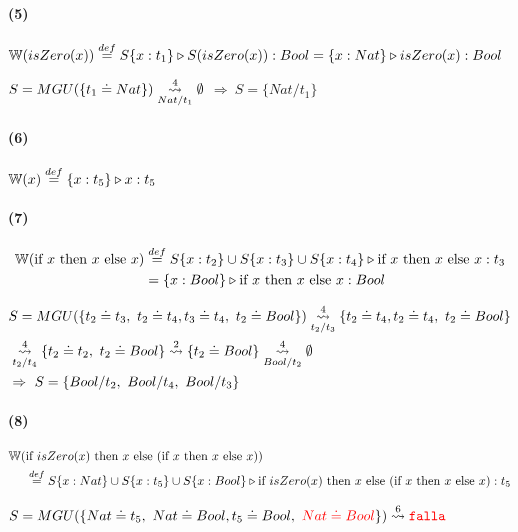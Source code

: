 \documentclass[10pt,a4paper]{article}
\begin{document}
\paragraph{(5)} $\WFunc(isZero(x)) \equalDef \judgeType{S\{x:t_1\}}{S(isZero(x))}{Bool} = \judgeType{\{x:Nat\}}{isZero(x)}{Bool}$ 
\begin{centrado}
$S = MGU(\{t_1 \doteq Nat\}) \goesTo{4}{Nat/t_1} \emptyset$ $\Rightarrow~S = \{Nat/t_1\}$
\end{centrado}

\paragraph{(6)} $\WFunc(x) \equalDef \judgeType{\{x:t_5\}}{x}{t_5}$

\paragraph{(7)} 
\begin{align*}
\WFunc(\lambdaIf{x}{x}{x}) &\equalDef \judgeType{S\{x:t_2\}\cup S\{x:t_3\}\cup S\{x:t_4\}}{\lambdaIf{x}{x}{x}}{t_3}\\ &= \judgeType{\{x:Bool\}}{\lambdaIf{x}{x}{x}}{Bool}
\end{align*}

\begin{align*}
&S = MGU(\{t_2 \doteq t_3,~t_2 \doteq t_4, t_3 \doteq t_4,~t_2 \doteq Bool\}) \goesTo{4}{t_2/t_3} \{t_2 \doteq t_4, t_2 \doteq t_4,~t_2 \doteq Bool\} \\ &\goesTo{4}{t_2/t_4} \{t_2 \doteq t_2,~t_2 \doteq Bool\} \goesTo{2}{} \{t_2 \doteq Bool\} \goesTo{4}{Bool/t_2} \emptyset \\
&\Rightarrow~S = \{Bool/t_2,~Bool/t_4,~Bool/t_3\}
\end{align*}


\paragraph{(8)}
\begin{align*}
\WFunc(&\lambdaIf{isZero(x)}{x}{(\lambdaIf{x}{x}{x}})) \\
&\equalDef \judgeType{S\{x:Nat\}\cup S\{x:t_5\}\cup S\{x:Bool\}}{\lambdaIf{isZero(x)}{x}{(\lambdaIf{x}{x}{x}})}{t_5}\\ 
\end{align*}

$S = MGU(\{Nat \doteq t_5,~Nat \doteq Bool, t_5 \doteq Bool,~\red{Nat \doteq Bool}\}) \goesTo{6}{} \falla$
\end{document}
